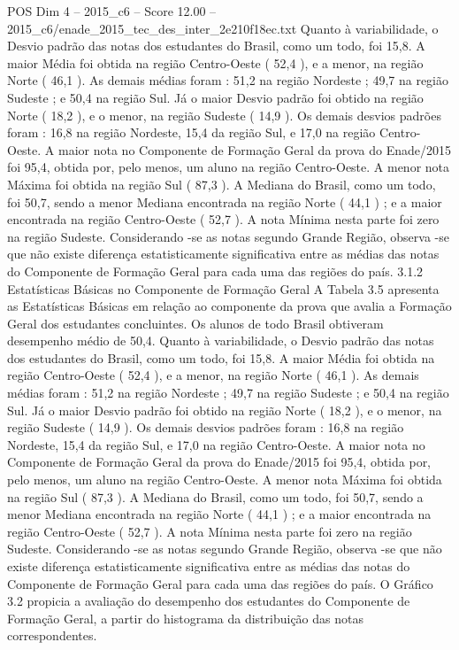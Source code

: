 \begin{textsample}{POS Dim 4 – 2015\_c6 – Score 12.00 – 2015\_c6/enade\_2015\_tec\_des\_inter\_2e210f18ec.txt}
Quanto à variabilidade, o Desvio padrão das notas dos estudantes do Brasil, como um todo, foi 15,8.
A maior Média foi obtida na região Centro-Oeste ( 52,4 ), e a menor, na região Norte ( 46,1 ).
As demais médias foram : 51,2 na região Nordeste ; 49,7 na região Sudeste ; e 50,4 na região Sul.
Já o maior Desvio padrão foi obtido na região Norte ( 18,2 ), e o menor, na região Sudeste ( 14,9 ).
Os demais desvios padrões foram : 16,8 na região Nordeste, 15,4 da região Sul, e 17,0 na região Centro-Oeste.
A maior nota no Componente de Formação Geral da prova do Enade/2015 foi 95,4, obtida por, pelo menos, um aluno na região Centro-Oeste.
A menor nota Máxima foi obtida na região Sul ( 87,3 ).
A Mediana do Brasil, como um todo, foi 50,7, sendo a menor Mediana encontrada na região Norte ( 44,1 ) ; e a maior encontrada na região Centro-Oeste ( 52,7 ).
A nota Mínima nesta parte foi zero na região Sudeste.
Considerando -se as notas segundo Grande Região, observa -se que não existe diferença estatisticamente significativa entre as médias das notas do Componente de Formação Geral para cada uma das regiões do país. 3.1.2 Estatísticas Básicas no Componente de Formação Geral A Tabela 3.5 apresenta as Estatísticas Básicas em relação ao componente da prova que avalia a Formação Geral dos estudantes concluintes.
Os alunos de todo Brasil obtiveram desempenho médio de 50,4.
Quanto à variabilidade, o Desvio padrão das notas dos estudantes do Brasil, como um todo, foi 15,8.
A maior Média foi obtida na região Centro-Oeste ( 52,4 ), e a menor, na região Norte ( 46,1 ).
As demais médias foram : 51,2 na região Nordeste ; 49,7 na região Sudeste ; e 50,4 na região Sul.
Já o maior Desvio padrão foi obtido na região Norte ( 18,2 ), e o menor, na região Sudeste ( 14,9 ).
Os demais desvios padrões foram : 16,8 na região Nordeste, 15,4 da região Sul, e 17,0 na região Centro-Oeste.
A maior nota no Componente de Formação Geral da prova do Enade/2015 foi 95,4, obtida por, pelo menos, um aluno na região Centro-Oeste.
A menor nota Máxima foi obtida na região Sul ( 87,3 ).
A Mediana do Brasil, como um todo, foi 50,7, sendo a menor Mediana encontrada na região Norte ( 44,1 ) ; e a maior encontrada na região Centro-Oeste ( 52,7 ).
A nota Mínima nesta parte foi zero na região Sudeste.
Considerando -se as notas segundo Grande Região, observa -se que não existe diferença estatisticamente significativa entre as médias das notas do Componente de Formação Geral para cada uma das regiões do país.
O Gráfico 3.2 propicia a avaliação do desempenho dos estudantes do Componente de Formação Geral, a partir do histograma da distribuição das notas correspondentes.

\end{textsample}

